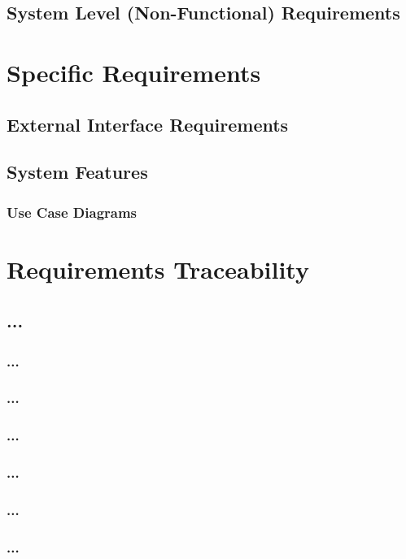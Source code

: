 \documentclass[12pt, oneside, letterpaper]{report}
\begin{document}
	\section{System Level (Non-Functional) Requirements}
		
\chapter{Specific Requirements}
	\section{External Interface Requirements}
		
	\section{System Features}
		\subsection{Use Case Diagrams}
		




\chapter{Requirements Traceability}
		\section{...}
			\subsection{...}
			\subsection{...}
			\subsection{...}
			\subsection{...}
			\subsection{...}
			\subsection{...}
\end{document}
